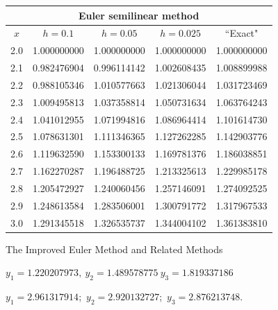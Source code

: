 \documentclass[dvips]{book}
\renewcommand{\exer}[1]{\par\medskip\;\noindent{\color{red}\bf #1.}}
\numberwithin{example}{section}
\numberwithin{equation}{section}
\numberwithin{theorem}{section}
\numberwithin{table}{section}
\numberwithin{figure}{section}
\begin{document}
\enlargethispage{1in}

{\small
\begin{tabular}{|c|r|r|r|r|}
\hline
\multicolumn{5}{|c|}{Euler semilinear method}\\\hline
\multicolumn{1}{|c|}{$x$}&
\multicolumn{1}{|c|}{$h=0.1$}&
\multicolumn{1}{|c|}{$h=0.05$}&
\multicolumn{1}{|c|}{$h=0.025$}&
\multicolumn{1}{|c|}{``Exact"}\\ \hline
2.0 & 1.000000000 & 1.000000000 & 1.000000000 & 1.000000000 \\
2.1 & 0.982476904 & 0.996114142 & 1.002608435 & 1.008899988 \\
2.2 & 0.988105346 & 1.010577663 & 1.021306044 & 1.031723469 \\
2.3 & 1.009495813 & 1.037358814 & 1.050731634 & 1.063764243 \\
2.4 & 1.041012955 & 1.071994816 & 1.086964414 & 1.101614730 \\
2.5 & 1.078631301 & 1.111346365 & 1.127262285 & 1.142903776 \\
2.6 & 1.119632590 & 1.153300133 & 1.169781376 & 1.186038851 \\
2.7 & 1.162270287 & 1.196488725 & 1.213325613 & 1.229985178 \\
2.8 & 1.205472927 & 1.240060456 & 1.257146091 & 1.274092525 \\
2.9 & 1.248613584 & 1.283506001 & 1.300791772 & 1.317967533 \\
3.0 & 1.291345518 & 1.326535737 & 1.344004102 & 1.361383810 \\
\hline
\end{tabular}}


\newpage




{The Improved Euler Method and Related Methods}
\renewcommand{\thissection}{}
\thissection

\vspace*{-15pt}

\exer{3.2.2}
$y_1=1.220207973,\ y_2=1.489578775\ y_3=1.819337186$


\exer{3.2.4}
$y_1=2.961317914$;\ $y_2=2.920132727$;\ $y_3=2.876213748$.
\end{document}
